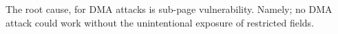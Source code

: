 
\begin{comment}
\footnote{\url{https://lore.kernel.org/lkml/20180510230948.GF190385@bhelgaas-glaptop.roam.corp.google.com/}}.
\end{comment}

The root cause, for DMA attacks is sub-page vulnerability. Namely; no DMA attack could work without the unintentional exposure of restricted fields. 

